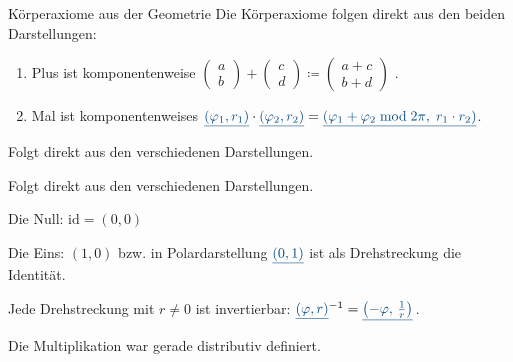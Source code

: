\begin{frame}{Körperaxiome aus der Geometrie}
Die Körperaxiome folgen direkt aus den beiden Darstellungen:
\begin{enumerate}
  \item  Plus ist komponentenweise $\begin{pmatrix} a\\b\end{pmatrix}+\begin{pmatrix} c\\d\end{pmatrix} \coloneq \begin{pmatrix} a+c\\b+d\end{pmatrix}$ .
  \item  Mal ist komponentenweises $\polar{\phi_1,r_1}\cdot \polar{\phi_2,r_2}= \polar{\phi_1+\phi_2 \bmod 2\pi,\;r_1\cdot r_2}$.
\end{enumerate}

  \medskip
  \begin{description}
    \item<2->[\normalfont Assoziativität bzgl $+,\cdot$] Folgt direkt aus den verschiedenen Darstellungen.
    \item<3->[\normalfont Kommutativität bzgl $+,\cdot$] Folgt direkt aus den verschiedenen Darstellungen.
    \item<4->[\normalfont Neutrales Element bzgl $+$] Die Null: $\mathrm{id} = (0,0)$  
    \item<5->[\normalfont Neutrales Element bzgl $\cdot$] Die Eins: $(1,0)$ bzw. in Polardarstellung $\polar{0,1}$ ist als Drehstreckung die Identität.
    \item<6->[\normalfont Inverses] Jede Drehstreckung mit $r \neq 0$ ist invertierbar:
      $\polar{\phi,r}^{-1} =\polar{-\phi,\,\frac{1}{r}}$\,. 
    \item<7->[\normalfont Distributivität] Die Multiplikation war gerade distributiv definiert.
  \end{description}
  \medskip
\end{frame}






